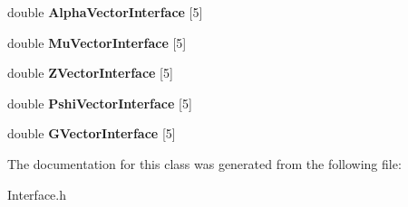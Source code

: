 \begin{DoxyCompactItemize}
\item 
double {\bfseries Alpha\+Vector\+Interface} \mbox{[}5\mbox{]}\hypertarget{classinterface_aa3f54ad5bd8d3081383f2190090b4109}{}\label{classinterface_aa3f54ad5bd8d3081383f2190090b4109}

\item 
double {\bfseries Mu\+Vector\+Interface} \mbox{[}5\mbox{]}\hypertarget{classinterface_aa740f1171fcddcb604c237cabbcebc1a}{}\label{classinterface_aa740f1171fcddcb604c237cabbcebc1a}

\item 
double {\bfseries Z\+Vector\+Interface} \mbox{[}5\mbox{]}\hypertarget{classinterface_a32902e62056c2479ade3f78167f1522f}{}\label{classinterface_a32902e62056c2479ade3f78167f1522f}

\item 
double {\bfseries Pshi\+Vector\+Interface} \mbox{[}5\mbox{]}\hypertarget{classinterface_a37044e7a6a8820ea4bcbcaf969628238}{}\label{classinterface_a37044e7a6a8820ea4bcbcaf969628238}

\item 
double {\bfseries G\+Vector\+Interface} \mbox{[}5\mbox{]}\hypertarget{classinterface_ab25dbd2f7aaa6921fd5edb973af98ed4}{}\label{classinterface_ab25dbd2f7aaa6921fd5edb973af98ed4}

\end{DoxyCompactItemize}


The documentation for this class was generated from the following file\+:\begin{DoxyCompactItemize}
\item 
Interface.\+h\end{DoxyCompactItemize}
